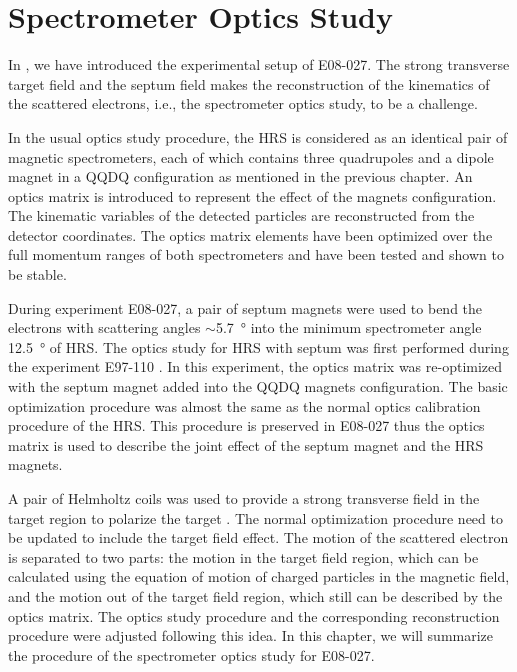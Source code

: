 
\chapter{Spectrometer Optics Study}
\label{C6}

In , we have introduced the experimental setup of E08-027. The strong transverse target field and the septum field makes the reconstruction of the kinematics of the scattered electrons, i.e., the spectrometer optics study, to be a challenge.

In the usual optics study procedure, the HRS is considered as an identical pair of magnetic spectrometers, each of which contains three quadrupoles and a dipole magnet in a QQDQ configuration as mentioned in the previous chapter. An optics matrix is introduced to represent the effect of the magnets configuration. The kinematic variables of the detected particles are reconstructed from the detector coordinates. The optics matrix elements have been optimized over the full momentum ranges of both spectrometers and have been tested and shown to be stable.

During experiment E08-027, a pair of septum magnets were used to bend the electrons with scattering angles $\sim$\SI{5.7}{\degree} into the minimum spectrometer angle \SI{12.5}{\degree} of HRS. The optics study for HRS with septum was first performed during the experiment E97-110 \cite{Sulkosky2005}. In this experiment, the optics matrix was re-optimized with the septum magnet added into the QQDQ magnets configuration. The basic optimization procedure was almost the same as the normal optics calibration procedure of the HRS. This procedure is preserved in E08-027 thus the optics matrix is used to describe the joint effect of the septum magnet and the HRS magnets.

A pair of Helmholtz coils was used to provide a strong transverse field in the target region to polarize the target \cite{Pierce2014}. The normal optimization procedure need to be updated to include the target field effect. The motion of the scattered electron is separated to two parts: the motion in the target field region, which can be calculated using the equation of motion of charged particles in the magnetic field, and the motion out of the target field region, which still can be described by the optics matrix. The optics study procedure and the corresponding reconstruction procedure were adjusted following this idea. In this chapter, we will summarize the procedure of the spectrometer optics study for E08-027.

